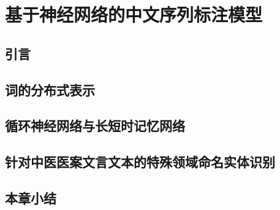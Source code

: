 \chapter{基于神经网络的中文序列标注模型}
\section{引言}
\section{词的分布式表示}
\section{循环神经网络与长短时记忆网络}
\section{针对中医医案文言文本的特殊领域命名实体识别}
\section{本章小结}
